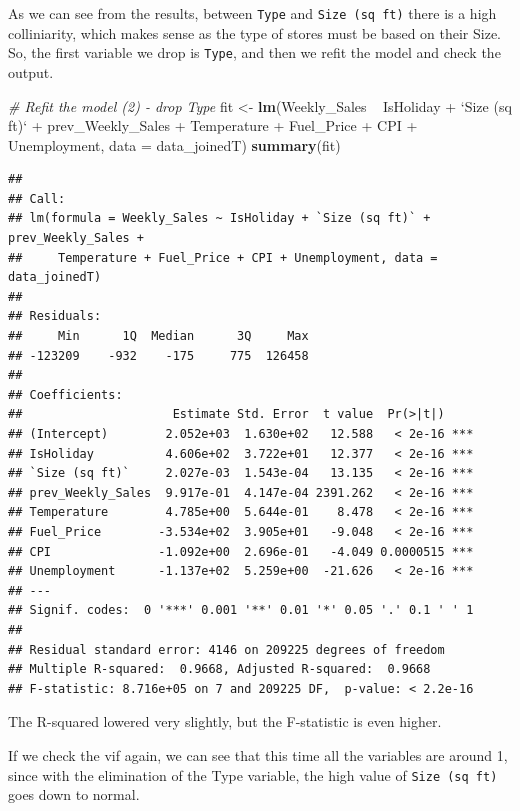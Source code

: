 \documentclass[11pt,]{article}
\newenvironment{Shaded}{\begin{snugshade}}{\end{snugshade}}
\newcommand{\KeywordTok}[1]{\textcolor[rgb]{0.13,0.29,0.53}{\textbf{{#1}}}}
\newcommand{\DataTypeTok}[1]{\textcolor[rgb]{0.13,0.29,0.53}{{#1}}}
\newcommand{\StringTok}[1]{\textcolor[rgb]{0.31,0.60,0.02}{{#1}}}
\newcommand{\CommentTok}[1]{\textcolor[rgb]{0.56,0.35,0.01}{\textit{{#1}}}}
\newcommand{\NormalTok}[1]{{#1}}
\begin{document}
As we can see from the results, between \texttt{Type} and
\texttt{Size\ (sq\ ft)} there is a high colliniarity, which makes sense
as the type of stores must be based on their Size. So, the first
variable we drop is \texttt{Type}, and then we refit the model and check
the output.

\begin{Shaded}
\begin{Highlighting}[]
\CommentTok{# Refit the model (2) - drop Type}
\NormalTok{fit <-}\StringTok{ }\KeywordTok{lm}\NormalTok{(Weekly_Sales ~}\StringTok{ }\NormalTok{IsHoliday +}\StringTok{ `}\DataTypeTok{Size (sq ft)}\StringTok{`} \NormalTok{+}\StringTok{ }\NormalTok{prev_Weekly_Sales +}\StringTok{ }
\StringTok{    }\NormalTok{Temperature +}\StringTok{ }\NormalTok{Fuel_Price +}\StringTok{ }\NormalTok{CPI +}\StringTok{ }\NormalTok{Unemployment, }\DataTypeTok{data =} \NormalTok{data_joinedT)}
\KeywordTok{summary}\NormalTok{(fit)}
\end{Highlighting}
\end{Shaded}

\begin{verbatim}
## 
## Call:
## lm(formula = Weekly_Sales ~ IsHoliday + `Size (sq ft)` + prev_Weekly_Sales + 
##     Temperature + Fuel_Price + CPI + Unemployment, data = data_joinedT)
## 
## Residuals:
##     Min      1Q  Median      3Q     Max 
## -123209    -932    -175     775  126458 
## 
## Coefficients:
##                     Estimate Std. Error  t value  Pr(>|t|)    
## (Intercept)        2.052e+03  1.630e+02   12.588   < 2e-16 ***
## IsHoliday          4.606e+02  3.722e+01   12.377   < 2e-16 ***
## `Size (sq ft)`     2.027e-03  1.543e-04   13.135   < 2e-16 ***
## prev_Weekly_Sales  9.917e-01  4.147e-04 2391.262   < 2e-16 ***
## Temperature        4.785e+00  5.644e-01    8.478   < 2e-16 ***
## Fuel_Price        -3.534e+02  3.905e+01   -9.048   < 2e-16 ***
## CPI               -1.092e+00  2.696e-01   -4.049 0.0000515 ***
## Unemployment      -1.137e+02  5.259e+00  -21.626   < 2e-16 ***
## ---
## Signif. codes:  0 '***' 0.001 '**' 0.01 '*' 0.05 '.' 0.1 ' ' 1
## 
## Residual standard error: 4146 on 209225 degrees of freedom
## Multiple R-squared:  0.9668, Adjusted R-squared:  0.9668 
## F-statistic: 8.716e+05 on 7 and 209225 DF,  p-value: < 2.2e-16
\end{verbatim}

The R-squared lowered very slightly, but the F-statistic is even higher.

If we check the vif again, we can see that this time all the variables
are around 1, since with the elimination of the Type variable, the high
value of \texttt{Size\ (sq\ ft)} goes down to normal.
\end{document}

